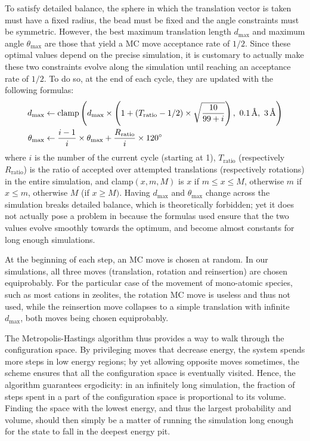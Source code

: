 \documentclass[main.tex]{subfiles}
\begin{document}
To satisfy detailed balance, the sphere in which the translation vector is taken must have a fixed radius, the bead must be fixed and the angle constraints must be symmetric. However, the best maximum translation length $d_{\max}$ and maximum angle $\theta_{\max}$ are those that yield a MC move acceptance rate of $1/2$. Since these optimal values depend on the precise simulation, it is customary to actually make these two constraints evolve along the simulation until reaching an acceptance rate of $1/2$. To do so, at the end of each cycle, they are updated with the following formulas:
\[\begin{split}
	d_{\max} &\gets \text{clamp}\paren{
		d_{\max}\times\paren{1+\paren{T_\text{ratio} - 1/2}\times\sqrt{\frac{10}{99+i}}},\ \qty{0.1}{\angstrom},\ \qty{3}{\angstrom}
	}\\
	\theta_{\max} &\gets \frac{i-1}i\times\theta_{\max} + \frac{R_\text{ratio}}{i}\times\qty{120}{\degree}
\end{split}\]
where $i$ is the number of the current cycle (starting at 1), $T_\text{ratio}$ (respectively $R_\text{ratio}$) is the ratio of accepted over attempted translations (respectively rotations) in the entire simulation, and clamp$(x, m, M)$ is $x$ if $m\le x \le M$, otherwise $m$ if $x\le m$, otherwise $M$ (if $x\ge M)$. Having $d_{\max}$ and $\theta_{\max}$ change across the simulation breaks detailed balance, which is theoretically forbidden; yet it does not actually pose a problem in because the formulas used ensure that the two values evolve smoothly towards the optimum, and become almost constants for long enough simulations.

At the beginning of each step, an MC move is chosen at random. In our simulations, all three moves (translation, rotation and reinsertion) are chosen equiprobably. For the particular case of the movement of mono-atomic species, such as most cations in zeolites, the rotation MC move is useless and thus not used, while the reinsertion move collapses to a simple translation with infinite $d_{\max}$, both moves being chosen equiprobably.

The Metropolis-Hastings algorithm thus provides a way to walk through the configuration space. By privileging moves that decrease energy, the system spends more steps in low energy regions; by yet allowing opposite moves sometimes, the scheme ensures that all the configuration space is eventually visited. Hence, the algorithm guarantees ergodicity: in an infinitely long simulation, the fraction of steps spent in a part of the configuration space is proportional to its volume. Finding the space with the lowest energy, and thus the largest probability and volume, should then simply be a matter of running the simulation long enough for the state to fall in the deepest energy pit.
\end{document}

